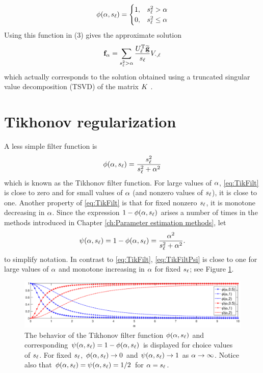\[\phi(\alpha,s_\ell) = \begin{cases}
1, & s_\ell^2 > \alpha \\
0, & s_\ell^2 \leq \alpha
\end{cases}\]
Using this function in (3) gives the approximate solution
\[\mathbf{f}_\alpha = \sum_{s_\ell^2 > \alpha} \frac{{U^{\mathrm{T}}_\ell}\widetilde{\mathbf{g}}}{s_\ell}V_{\cdot,\ell}\]
which actually corresponds to the solution obtained using a truncated singular value decomposition (TSVD) of the matrix $K$ \cite[p.~3-5]{Vogel:2002}. \par

\section{Tikhonov regularization} \label{sec:Tikhonov reg.}

A less simple filter function is
\begin{equation}
\phi(\alpha,s_\ell)  = \frac{s_\ell^2}{s_\ell^2 + \alpha^2}
\label{eq:TikFilt}
\end{equation}
which is known as the Tikhonov filter function. For large values of $\alpha$, \eqref{eq:TikFilt} is close to zero and for small values of $\alpha$ (and nonzero values of $s_\ell$), it is close to one. Another property of \eqref{eq:TikFilt} is that for fixed nonzero $s_\ell$, it is monotone decreasing in $\alpha$. Since the expression $1 - \phi(\alpha,s_\ell)$ arises a number of times in the methods introduced in Chapter \ref{ch:Parameter estimation methods}, let
\begin{equation}
\psi(\alpha,s_\ell) = 1 - \phi(\alpha,s_\ell) = \frac{\alpha^2}{s_\ell^2 + \alpha^2}.
\label{eq:TikFiltPsi}
\end{equation}
to simplify notation. In contrast to \eqref{eq:TikFilt}, \eqref{eq:TikFiltPsi} is close to one for large values of $\alpha$ and monotone increasing in $\alpha$ for fixed $s_\ell$; see Figure \ref{fig:Phi Psi Plot}. \par 

\begin{figure}
	\centerline{\includegraphics[scale = 0.4]{Figures/Phi_Psi_Plot.eps}}
\caption{The behavior of the Tikhonov filter function $\phi(\alpha,s_\ell)$ and corresponding $\psi(\alpha,s_\ell) = 1 - \phi(\alpha,s_\ell)$ is displayed for choice values of $s_\ell$. For fixed $s_\ell$, $\phi(\alpha,s_\ell) \rightarrow 0$ and $\psi(\alpha,s_\ell) \rightarrow 1$ as $\alpha \rightarrow \infty$. Notice also that $\phi(\alpha,s_\ell) = \psi(\alpha,s_\ell) = 1/2$ for $\alpha = s_\ell$.}
\label{fig:Phi Psi Plot}
\end{figure}

